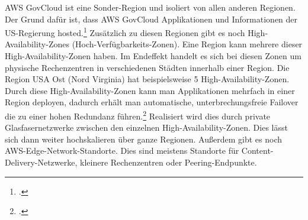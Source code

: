 \documentclass[titlepage]{report}
\begin{document}
AWS GovCloud ist eine Sonder\hyp{}Region und isoliert von allen anderen
Regionen. Der Grund dafür ist, dass AWS GovCloud Applikationen und
Informationen der US\hyp{}Regierung hosted.\footcite{govcloud} Zusätzlich zu
diesen Regionen gibt es noch High\hyp{}Availability\hyp{}Zones
(Hoch\hyp{}Verfügbarkeits\hyp{}Zonen). Eine Region kann mehrere dieser
High\hyp{}Availability\hyp{}Zonen haben. Im Endeffekt handelt es sich bei
diesen Zonen um physische Rechenzentren in verschiedenen Städten innerhalb
einer Region. Die Region USA Ost (Nord Virginia) hat beispielsweise 5
High\hyp{}Availability\hyp{}Zonen. Durch diese
High\hyp{}Availability\hyp{}Zonen kann man Applikationen mehrfach in einer
Region deployen, dadurch erhält man automatische, unterbrechungsfreie Failover
die zu einer hohen Redundanz führen.\footcite{region} Realisiert wird dies
durch private Glasfasernetzwerke zwischen den einzelnen
High\hyp{}Availability\hyp{}Zonen. Dies lässt sich dann weiter hochskalieren
über ganze Regionen. Außerdem gibt es noch
AWS\hyp{}Edge\hyp{}Network\hyp{}Standorte. Dies sind meistens Standorte für
Content\hyp{}Delivery\hyp{}Netzwerke, kleinere Rechenzentren oder
Peering\hyp{}Endpunkte.
\end{document}
